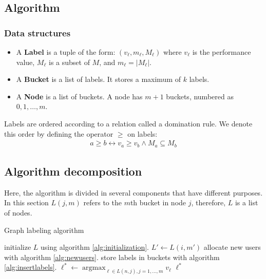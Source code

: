 \documentclass[a4paper, 10pt]{article}
\DeclareMathOperator*{\argmax}{argmax}
\begin{document}
\subsection*{Algorithm}

\subsubsection*{Data structures}
\begin{itemize}
    \item A \textbf{Label} is a tuple of the form: $(v_\ell, m_\ell, M_\ell)$ 
        where $v_\ell$ is the performance value,
        $M_\ell$ is a subset of $M$, 
        and $m_\ell = |M_\ell|$.
    \item A \textbf{Bucket} is a list of labels. It stores a maximum of $k$ labels.
    \item A \textbf{Node} is a list of buckets. A node has $m + 1$ buckets, numbered as $0, 1, \dots, m$.
\end{itemize}

Labels are ordered according to a relation called a domination rule. 
We denote this order by defining the operator $\geq$ on labels:
\begin{align*}
    a \geq b \leftrightarrow v_a \geq v_b \land M_a \subseteq M_b
\end{align*}

\subsection*{Algorithm decomposition}

Here, the algorithm is divided in several components that have different purposes.
In this section $L(j,m)$ refers to the $m$th bucket in node $j$, therefore, $L$ is a list of nodes.

\begin{algorithm}
    \caption{Graph labeling algorithm}
    \label{alg:GLA algorithm}
    \begin{algorithmic}
        \STATE initialize $L$ using algorithm \ref{alg:initialization}.
                    \STATE $L' \leftarrow L(i, m')$
                    \STATE allocate new users with algorithm \ref{alg:newusers}.
                    \STATE store labels in buckets with algorithm \ref{alg:insertlabels}.
                \ENDFOR
            \ENDFOR
        \ENDFOR
        \STATE $\ell^* \leftarrow \argmax_{\ell \in L(n,j), j = 1, \dots, m} v_\ell$
        \RETURN $\ell^*$
    \end{algorithmic}
\end{algorithm}
\end{document}
